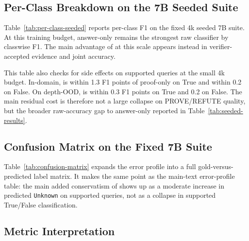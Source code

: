 \subsection{Per-Class Breakdown on the 7B Seeded Suite}

Table~\ref{tab:per-class-seeded} reports per-class F1 on the fixed 4k seeded 7B suite. At this training budget, answer-only remains the strongest raw classifier by classwise F1. The main advantage of \model{} at this scale appears instead in verifier-accepted evidence and joint accuracy.

\begin{table}[t]
\centering
\small

\caption{Per-class F1 on the fixed 7B seeded suite. This table helps separate raw class prediction from verifier-accepted evidence.}
\label{tab:per-class-seeded}
\end{table}

This table also checks for side effects on supported queries at the small 4k
budget. In-domain, \model{} is within 1.3 F1 points of proof-only on True and
within 0.2 on False. On depth-OOD, \model{} is within 0.3 F1 points on True and
0.2 on False. The main residual cost is therefore not a large collapse on
PROVE/REFUTE quality, but the broader raw-accuracy gap to answer-only reported
in Table~\ref{tab:seeded-results}.

\subsection{Confusion Matrix on the Fixed 7B Suite}

Table~\ref{tab:confusion-matrix} expands the error profile into a full
gold-versus-predicted label matrix. It makes the same point as the main-text
error-profile table: the main added conservatism of \model{} shows up as a
moderate increase in predicted \texttt{Unknown} on supported queries, not as a
collapse in supported True/False classification.

\begin{table}[t]
\centering
\small

\caption{Confusion matrix on the fixed 7B seeded suite. The rows are grouped by
gold label and reported separately for each variant.}
\label{tab:confusion-matrix}
\end{table}

\subsection{Metric Interpretation}

